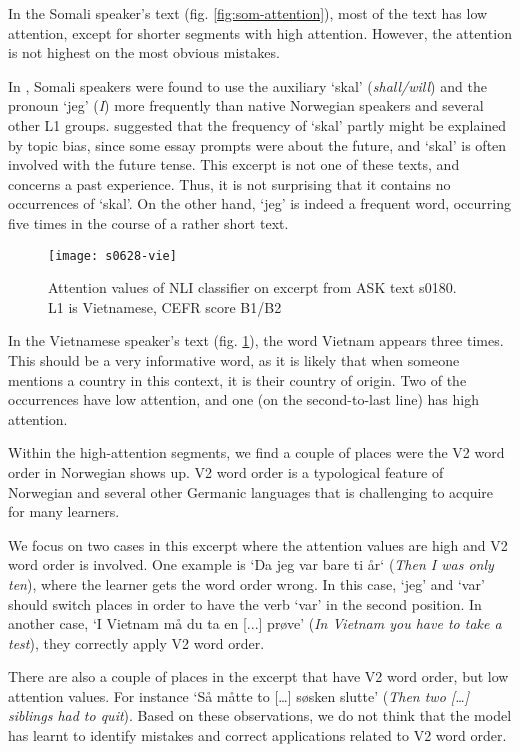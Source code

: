 In the Somali speaker's text (fig. \ref{fig:som-attention}), most of the text
has low attention, except for shorter segments with high attention. However,
the attention is not highest on the most obvious mistakes.

In \textcite{pepper2012}, Somali speakers were found to use the auxiliary
`skal' (\emph{shall/will}) and the pronoun `jeg' (\emph{I}) more frequently
than native Norwegian speakers and several other L1 groups.
\citeauthor{pepper2012} suggested that the frequency of `skal' partly might
be explained by topic bias, since some essay prompts were about the future,
and `skal' is often involved with the future tense. This excerpt is not one of
these texts, and concerns a past experience. Thus, it is not surprising that
it contains no occurrences of `skal'. On the other hand, `jeg' is indeed a
frequent word, occurring five times in the course of a rather short text.

\begin{figure}
  \centering
  \texttt{[image: s0628-vie]}
  \caption[Attention in a text by a Vietnamese speaker]{
    Attention values of NLI classifier on excerpt from ASK text s0180. L1 is
    Vietnamese, CEFR score B1/B2
  }
  \label{fig:vie-attention}
\end{figure}

In the Vietnamese speaker's text (fig. \ref{fig:vie-attention}), the word
Vietnam appears three times. This should be a very informative word, as it is
likely that when someone mentions a country in this context, it is their
country of origin. Two of the occurrences have low attention, and one (on the
second-to-last line) has high attention.

Within the high-attention segments, we find a couple of places were the V2
word order in Norwegian shows up. V2 word order is a typological feature of
Norwegian and several other Germanic languages that is challenging to acquire
for many learners.

We focus on two cases in this excerpt where the attention values are high and
V2 word order is involved. One example is `Da jeg var bare ti år` (\emph{Then
I was only ten}), where the learner gets the word order wrong. In this case,
`jeg' and `var' should switch places in order to have the verb `var' in the
second position. In another case, `I Vietnam må du ta en [...] prøve'
(\emph{In Vietnam you have to take a test}), they correctly apply V2 word
order.

There are also a couple of places in the excerpt that have V2 word order, but
low attention values. For instance `Så måtte to […] søsken slutte'
(\emph{Then two […] siblings had to quit}). Based on these observations, we
do not think that the model has learnt to identify mistakes and correct
applications related to V2 word order.


